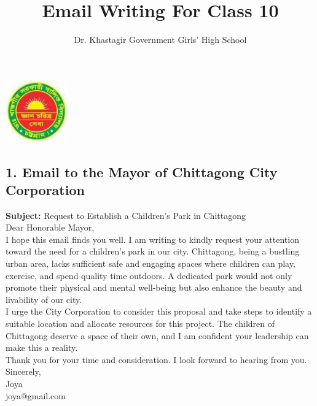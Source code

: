 \documentclass{article}
\title{Email Writing For Class 10}
\author{Dr. Khastagir Government Girls' High School}
\date{} %
\begin{document}
\maketitle
\begin{center}
    \includegraphics[width=0.2\textwidth]{images.jpg} %
\end{center}
\subsection*{1. Email to the Mayor of Chittagong City Corporation}
\textbf{Subject:} Request to Establish a Children’s Park in Chittagong \\
Dear Honorable Mayor, \\
I hope this email finds you well. I am writing to kindly request your attention toward the need for a children’s park in our city. Chittagong, being a bustling urban area, lacks sufficient safe and engaging spaces where children can play, exercise, and spend quality time outdoors. A dedicated park would not only promote their physical and mental well-being but also enhance the beauty and livability of our city. \\
I urge the City Corporation to consider this proposal and take steps to identify a suitable location and allocate resources for this project. The children of Chittagong deserve a space of their own, and I am confident your leadership can make this a reality. \\
Thank you for your time and consideration. I look forward to hearing from you. \\
Sincerely, \\
Joya \\
joya@gmail.com \\
\end{document}
